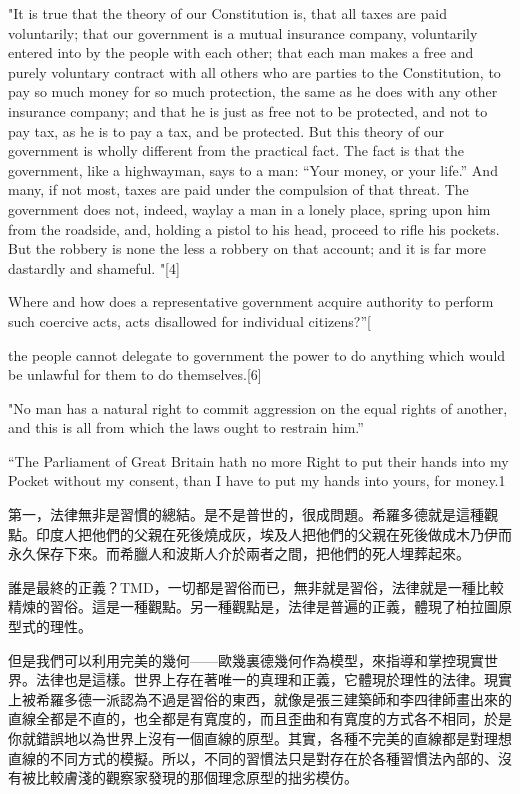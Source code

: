 "It is true that the theory of our Constitution is, that all taxes are paid voluntarily; that our government is a mutual insurance company, voluntarily entered into by the people with each other; that each man makes a free and purely voluntary contract with all others who are parties to the Constitution, to pay so much money for so much protection, the same as he does with any other insurance company; and that he is just as free not to be protected, and not to pay tax, as he is to pay a tax, and be protected. But this theory of our government is wholly different from the practical fact. The fact is that the government, like a highwayman, says to a man: “Your money, or your life.” And many, if not most, taxes are paid under the compulsion of that threat. The government does not, indeed, waylay a man in a lonely place, spring upon him from the roadside, and, holding a pistol to his head, proceed to rifle his pockets. But the robbery is none the less a robbery on that account; and it is far more dastardly and shameful. "[4]


Where and how does a representative government acquire authority to perform such coercive acts, acts disallowed for individual citizens?”[

the people cannot delegate to government the power to do anything which would be unlawful for them to do themselves.[6]



"No man has a natural right to commit aggression on the equal rights of another, and this is all from which the laws ought to restrain him.”


“The Parliament of Great Britain hath no more Right to put their hands into my Pocket without my consent, than I have to put my hands into yours, for money.1



第一，法律無非是習慣的總結。是不是普世的，很成問題。希羅多德就是這種觀點。印度人把他們的父親在死後燒成灰，埃及人把他們的父親在死後做成木乃伊而永久保存下來。而希臘人和波斯人介於兩者之間，把他們的死人埋葬起來。

誰是最終的正義？TMD，一切都是習俗而已，無非就是習俗，法律就是一種比較精煉的習俗。這是一種觀點。另一種觀點是，法律是普遍的正義，體現了柏拉圖原型式的理性。

但是我們可以利用完美的幾何——歐幾裏德幾何作為模型，來指導和掌控現實世界。法律也是這樣。世界上存在著唯一的真理和正義，它體現於理性的法律。現實上被希羅多德一派認為不過是習俗的東西，就像是張三建築師和李四律師畫出來的直線全都是不直的，也全都是有寬度的，而且歪曲和有寬度的方式各不相同，於是你就錯誤地以為世界上沒有一個直線的原型。其實，各種不完美的直線都是對理想直線的不同方式的模擬。所以，不同的習慣法只是對存在於各種習慣法內部的、沒有被比較膚淺的觀察家發現的那個理念原型的拙劣模仿。

